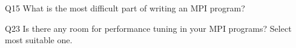 \begin{description}%
\item{Q15} What is the most difficult part of writing an MPI program?%
\item{Q23} Is there any room for performance tuning in your MPI programs? Select most suitable one.%
\end{description}%
